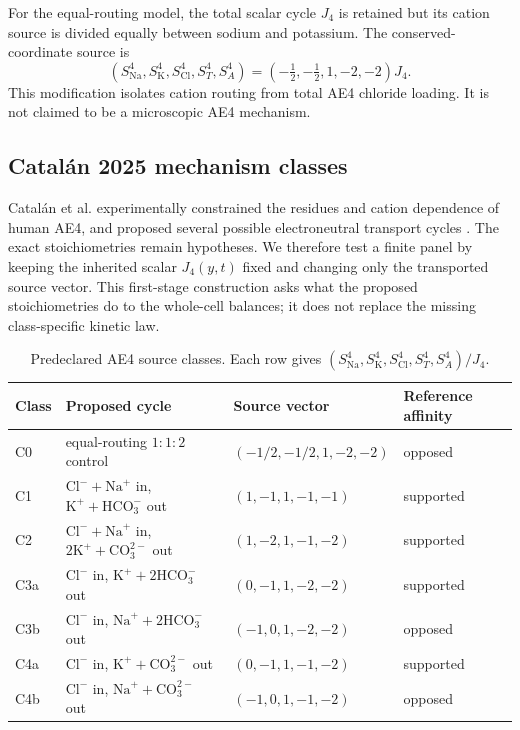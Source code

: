 \documentclass[11pt]{article}
\newcommand{\Na}{\mathrm{Na}^{+}}
\newcommand{\K}{\mathrm{K}^{+}}
\newcommand{\Cl}{\mathrm{Cl}^{-}}
\newcommand{\HCO}{\mathrm{HCO}_{3}^{-}}
\newcommand{\COthree}{\mathrm{CO}_{3}^{2-}}
\begin{document}
For the equal-routing model, the total scalar cycle $J_4$ is retained but its cation source is divided equally between sodium and potassium. The conserved-coordinate source is
\begin{equation}
    \left(S^4_{\mathrm{Na}},S^4_{\mathrm K},S^4_{\mathrm{Cl}},S^4_T,S^4_A\right)
    =\left(-\tfrac12,-\tfrac12,1,-2,-2\right)J_4.
    \label{eq:equal-routing-source}
\end{equation}
This modification isolates cation routing from total AE4 chloride loading. It is not claimed to be a microscopic AE4 mechanism.

\subsection{Catalán 2025 mechanism classes}
\label{sec:catalan-classes}

Catalán et al. experimentally constrained the residues and cation dependence of human AE4, and proposed several possible electroneutral transport cycles \citep{Catalan2025}. The exact stoichiometries remain hypotheses. We therefore test a finite panel by keeping the inherited scalar $J_4(y,t)$ fixed and changing only the transported source vector. This first-stage construction asks what the proposed stoichiometries do to the whole-cell balances; it does not replace the missing class-specific kinetic law.

\begin{table}[t]
\centering
\caption{Predeclared AE4 source classes. Each row gives $(S_{\mathrm{Na}}^4,S_{\mathrm K}^4,S_{\mathrm{Cl}}^4,S_T^4,S_A^4)/J_4$.}
\label{tab:mechanism-classes}
\footnotesize
\begin{tabularx}{\textwidth}{lXXl}
\toprule
Class & Proposed cycle & Source vector & Reference affinity \\
\midrule
C0 & equal-routing $1:1:2$ control & $(-1/2,-1/2,1,-2,-2)$ & opposed \\
C1 & $\Cl+\Na$ in, $\K+\HCO$ out & $(1,-1,1,-1,-1)$ & supported \\
C2 & $\Cl+\Na$ in, $2\K+\COthree$ out & $(1,-2,1,-1,-2)$ & supported \\
C3a & $\Cl$ in, $\K+2\HCO$ out & $(0,-1,1,-2,-2)$ & supported \\
C3b & $\Cl$ in, $\Na+2\HCO$ out & $(-1,0,1,-2,-2)$ & opposed \\
C4a & $\Cl$ in, $\K+\COthree$ out & $(0,-1,1,-1,-2)$ & supported \\
C4b & $\Cl$ in, $\Na+\COthree$ out & $(-1,0,1,-1,-2)$ & opposed \\
\bottomrule
\end{tabularx}
\end{table}
\end{document}
